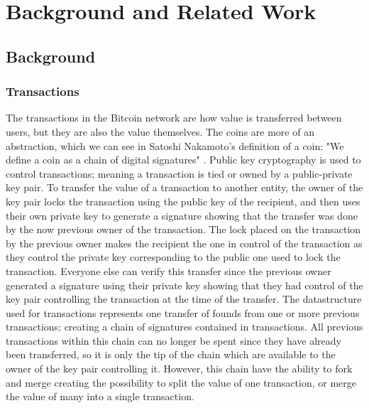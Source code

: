 \chapter{Background and Related Work}
\label{chap:related}


\section{Background}

\subsection{Transactions}

The transactions in the Bitcoin network are how value is transferred between users, but they are also the value themselves.
The coins are more of an abstraction, which we can see in Satoshi Nakamoto's definition of a coin: "We define a coin as a chain of digital signatures" \cite{nakamoto2008bitcoin}.
Public key cryptography is used to control transactions; meaning a transaction is tied or owned by a public-private key pair.
To transfer the value of a transaction to another entity, the owner of the key pair locks the transaction using the public key of the recipient, and then uses their own private key to generate a signature showing that the transfer was done by the now previous owner of the transaction. The lock placed on the transaction by the previous owner makes the recipient the one in control of the transaction as they control the private key corresponding to the public one used to lock the transaction. Everyone else  can verify this transfer since the previous owner generated a signature using their private key showing that they had control of the key pair controlling the transaction at the time of the transfer. The datastructure used for transactions represents one transfer of founds from one or more previous transactions; creating a chain of signatures contained in transactions. All previous transactions within this chain can no longer be spent since they have already been transferred, so it is only the tip of the chain which are available to the owner of the key pair controlling it. However, this chain have the ability to fork and merge creating the possibility to split the value of one transaction, or merge the value of many into a single transaction. 
